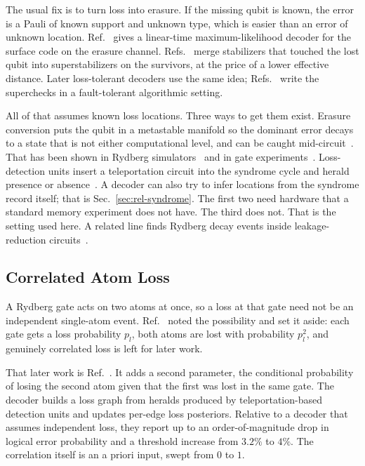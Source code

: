 \documentclass{ieeeaccess}
\begin{document}
The usual fix is to turn loss into erasure. If the missing qubit is known, the
error is a Pauli of known support and unknown type, which is easier than an
error of unknown location. Ref.~\cite{delfosse2020erasuredecoding} gives a
linear-time maximum-likelihood decoder for the surface code on the erasure
channel. Refs.~\cite{stace2009lossthresholds,stace2010degeneracyloss} merge
stabilizers that touched the lost qubit into superstabilizers on the survivors,
at the price of a lower effective distance. Later loss-tolerant decoders use
the same idea; Refs.~\cite{baranes2026lossdetection,baranes2025architecture}
write the superchecks in a fault-tolerant algorithmic setting.

All of that assumes known loss locations. Three ways to get them exist.
Erasure conversion puts the qubit in a metastable manifold so the dominant
error decays to a state that is not either computational level, and can be
caught mid-circuit~\cite{wu2022erasureconversion}. That has been shown in
Rydberg simulators~\cite{scholl2023erasurerydberg} and in gate
experiments~\cite{ma2023midcircuiterasure}. Loss-detection units insert a
teleportation circuit into the syndrome cycle and herald presence or
absence~\cite{perrin2026correlatedloss}. A decoder can also try to infer
locations from the syndrome record itself; that is
Sec.~\ref{sec:rel-syndrome}. The first two need hardware that a standard memory
experiment does not have. The third does not. That is the setting used here.
A related line finds Rydberg decay events inside leakage-reduction
circuits~\cite{yu2026rydbergdecayswaplrc}.

\subsection{Correlated Atom Loss}
\label{sec:rel-correlated}

A Rydberg gate acts on two atoms at once, so a loss at that gate need not be an
independent single-atom event. Ref.~\cite{perrin2025qecatomloss} noted the
possibility and set it aside: each gate gets a loss probability $p_l$, both
atoms are lost with probability $p_l^2$, and genuinely correlated loss is left
for later work.

That later work is Ref.~\cite{perrin2026correlatedloss}. It adds a second
parameter, the conditional probability of losing the second atom given that the
first was lost in the same gate. The decoder builds a loss graph from heralds
produced by teleportation-based detection units and updates per-edge loss
posteriors. Relative to a decoder that assumes independent loss, they report up
to an order-of-magnitude drop in logical error probability and a threshold
increase from $3.2\%$ to $4\%$. The correlation itself is an a priori input,
swept from $0$ to $1$.
\end{document}

